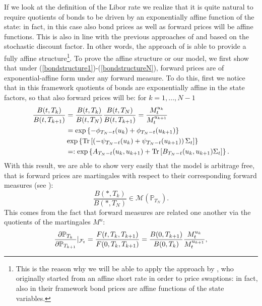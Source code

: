 If we look at the definition of the Libor rate we realize that it is quite natural to require quotients of bonds to be driven by an exponentially affine function of the state: in fact, in this case also bond prices as well as forward prices will be affine functions. This is also in line with the previous approaches of \cite{article_Constantinides92} and \cite{gou11} based on the stochastic discount factor. In other words, the approach of \cite{article_KRPT2009} is able to provide a fully affine structure\footnote{This is the reason why we will be able to apply the approach  by \cite{article_CollinDufresneGoldstein2002}, who originally started from an affine short rate in order to price swaptions: in fact, also in their framework bond prices are affine functions of the state variables.}. To prove the affine structure or our model, we first show that under (\ref{bondstructure1})-(\ref{bondstructureN}), forward prices are of exponential-affine form
under any forward measure. To do this, first we notice that in this framework quotients of bonds are exponentially affine in the state factors, so that also forward prices will be: for $k=1,...,N-1$
\begin{align}
\frac{B(t,T_{k})}{B(t,T_{k+1})}&=\frac{B(t,T_{k})}{B(t,T_{N})}\frac{B(t,T_{N})}{B(t,T_{k+1})}=\frac{M_{t}^{u_{k}}}{M_{t}^{u_{k+1}}}\nonumber\\
&=\exp\left\{ -\phi_{T_{N}-t}(u_{k})+\phi_{T_{N}-t}(u_{k+1})\right\} \nonumber\\
&\exp\left\{\textup{Tr}\left[\left(-\psi_{T_{N}-t}(u_{k})+\psi_{T_{N}-t}(u_{k+1})\right)\Sigma_{t}\right]\right\}\nonumber\\
&=:\exp\left\{A_{T_{N}-t}(u_{k},u_{k+1})+\textup{Tr}\left[B_{T_{N}-t}(u_{k},u_{k+1})\Sigma_{t}\right]\right\}.\label{exponentiallyAB}
\end{align}
With this result, we are able to show very easily that the model is arbitrage free, that is forward prices are martingales with respect to their corresponding forward measures (see \cite{Geman_1995}):
\begin{equation}
\frac{B(*,T_{k})}{B(*,T_{N})}\in \mathcal{M}\left( \mathbb{P}_{T_{N}}\right).
\end{equation}
This comes from the fact that forward measures are related one another via the quotients of the martingales $M^{u}$:
\begin{equation}
\frac{\partial \mathbb{P}_{T_{k}}}{\partial \mathbb{P}_{T_{k+1}}} \arrowvert_{\mathcal{F}_{t}}=\frac{F(t,T_{k},T_{k+1})}{F(0,T_{k},T_{k+1})}=\frac{B(0,T_{k+1})}{B(0,T_{k})}\frac{M^{u_{k}}_{t}}{M^{u_{k+1}}_{t}},
\end{equation}
